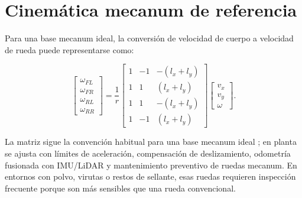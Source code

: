 \section{Cinemática mecanum de referencia}

Para una base mecanum ideal, la conversión de velocidad de cuerpo a velocidad de rueda puede representarse como:

\[
\begin{bmatrix}
\omega_{FL}\\
\omega_{FR}\\
\omega_{RL}\\
\omega_{RR}
\end{bmatrix}
=
\frac{1}{r}
\begin{bmatrix}
1 & -1 & -(l_x+l_y)\\
1 & 1 & (l_x+l_y)\\
1 & 1 & -(l_x+l_y)\\
1 & -1 & (l_x+l_y)
\end{bmatrix}
\begin{bmatrix}
v_x\\
v_y\\
\omega
\end{bmatrix}.
\]

La matriz sigue la convención habitual para una base mecanum ideal \cite{lynchPark2017}; en planta se ajusta con límites de aceleración, compensación de deslizamiento, odometría fusionada con IMU/LiDAR y mantenimiento preventivo de ruedas mecanum. En entornos con polvo, virutas o restos de sellante, esas ruedas requieren inspección frecuente porque son más sensibles que una rueda convencional.
